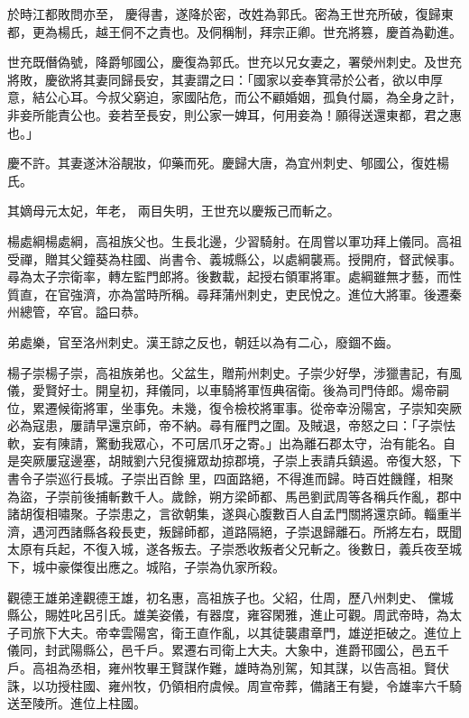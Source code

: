 \begin{pinyinscope}
 於時江都敗問亦至，
 慶得書，遂降於密，改姓為郭氏。密為王世充所破，復歸東都，更為楊氏，越王侗不之責也。及侗稱制，拜宗正卿。世充將篡，慶首為勸進。



 世充既僭偽號，降爵郇國公，慶復為郭氏。世充以兄女妻之，署滎州刺史。及世充將敗，慶欲將其妻同歸長安，其妻謂之曰：「國家以妾奉箕帚於公者，欲以申厚意，結公心耳。今叔父窮迫，家國阽危，而公不顧婚姻，孤負付屬，為全身之計，非妾所能責公也。妾若至長安，則公家一婢耳，何用妾為！願得送還東都，君之惠也。」



 慶不許。其妻遂沐浴靚妝，仰藥而死。慶歸大唐，為宜州刺史、郇國公，復姓楊氏。



 其嫡母元太妃，年老，
 兩目失明，王世充以慶叛己而斬之。



 楊處綱楊處綱，高祖族父也。生長北邊，少習騎射。在周嘗以軍功拜上儀同。高祖受禪，贈其父鐘葵為柱國、尚書令、義城縣公，以處綱襲焉。授開府，督武候事。尋為太子宗衛率，轉左監門郎將。後數載，起授右領軍將軍。處綱雖無才藝，而性質直，在官強濟，亦為當時所稱。尋拜蒲州刺史，吏民悅之。進位大將軍。後遷秦州總管，卒官。謚曰恭。



 弟處樂，官至洛州刺史。漢王諒之反也，朝廷以為有二心，廢錮不齒。



 楊子崇楊子崇，高祖族弟也。父盆生，贈荊州刺史。子崇少好學，涉獵書記，有風儀，愛賢好士。開皇初，拜儀同，以車騎將軍恆典宿衛。後為司門侍郎。煬帝嗣位，累遷候衛將軍，坐事免。未幾，復令檢校將軍事。從帝幸汾陽宮，子崇知突厥必為寇患，屢請早還京師，帝不納。尋有雁門之圍。及賊退，帝怒之曰：「子崇怯軟，妄有陳請，驚動我眾心，不可居爪牙之寄。」出為離石郡太守，治有能名。自是突厥屢寇邊塞，胡賊劉六兒復擁眾劫掠郡境，子崇上表請兵鎮遏。帝復大怒，下書令子崇巡行長城。子崇出百餘
 里，四面路絕，不得進而歸。時百姓饑饉，相聚為盜，子崇前後捕斬數千人。歲餘，朔方梁師都、馬邑劉武周等各稱兵作亂，郡中諸胡復相嘯聚。子崇患之，言欲朝集，遂與心腹數百人自孟門關將還京師。輜重半濟，遇河西諸縣各殺長吏，叛歸師都，道路隔絕，子崇退歸離石。所將左右，既聞太原有兵起，不復入城，遂各叛去。子崇悉收叛者父兄斬之。後數日，義兵夜至城下，城中豪傑復出應之。城陷，子崇為仇家所殺。



 觀德王雄弟達觀德王雄，初名惠，高祖族子也。父紹，仕周，歷八州刺史、
 儻城縣公，賜姓叱呂引氏。雄美姿儀，有器度，雍容閑雅，進止可觀。周武帝時，為太子司旅下大夫。帝幸雲陽宮，衛王直作亂，以其徒襲肅章門，雄逆拒破之。進位上儀同，封武陽縣公，邑千戶。累遷右司衛上大夫。大象中，進爵邗國公，邑五千戶。高祖為丞相，雍州牧畢王賢謀作難，雄時為別駕，知其謀，以告高祖。賢伏誅，以功授柱國、雍州牧，仍領相府虞候。周宣帝葬，備諸王有變，令雄率六千騎送至陵所。進位上柱國。




\end{pinyinscope}
